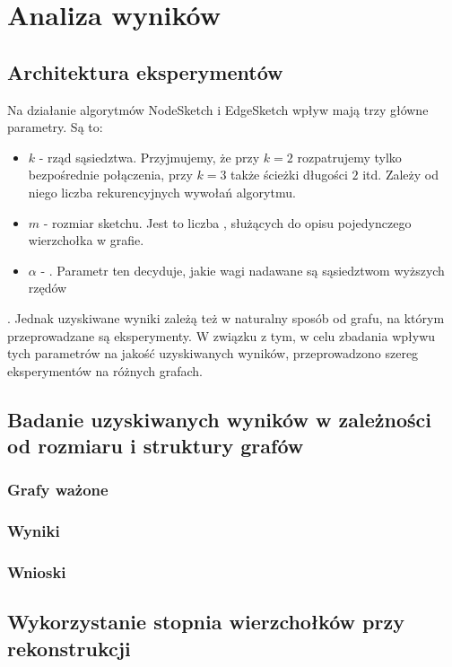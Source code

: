 \chapter{Analiza wyników}

\section{Architektura eksperymentów}

    Na działanie algorytmów NodeSketch i EdgeSketch wpływ mają trzy główne parametry. Są to:
    \begin{itemize}
        \item $k$ - rząd sąsiedztwa. Przyjmujemy, że przy $k = 2$ rozpatrujemy tylko bezpośrednie połączenia, przy $k = 3$ także ścieżki długości $2$ itd. Zależy od niego liczba rekurencyjnych wywołań algorytmu.
        \item $m$ - rozmiar sketchu. Jest to liczba , służących do opisu pojedynczego wierzchołka w grafie. 
        \item $\alpha$ - . Parametr ten decyduje, jakie wagi nadawane są sąsiedztwom wyższych rzędów
    \end{itemize}

    . Jednak uzyskiwane wyniki zależą też w naturalny sposób od grafu, na którym przeprowadzane są eksperymenty. W związku z tym, w celu zbadania wpływu tych parametrów na jakość uzyskiwanych wyników, przeprowadzono szereg eksperymentów na różnych grafach.

\section{Badanie uzyskiwanych wyników w zależności od rozmiaru i struktury grafów}
    \subsection{Grafy ważone}
    \subsection{Wyniki}

    \subsection{Wnioski}

\section{Wykorzystanie stopnia wierzchołków przy rekonstrukcji}

